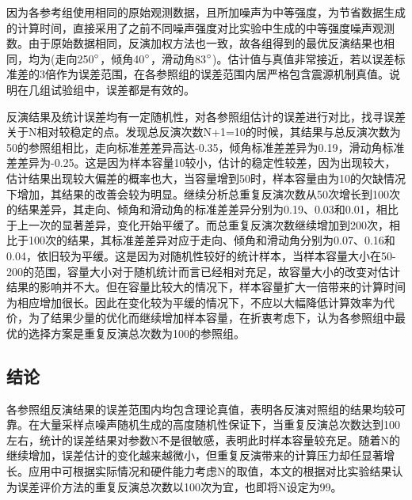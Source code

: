 因为各参考组使用相同的原始观测数据，且所加噪声为中等强度，为节省数据生成的计算时间，直接采用了之前不同噪声强度对比实验中生成的中等强度噪声观测数。由于原始数据相同，反演加权方法也一致，故各组得到的最优反演结果也相同，均为(走向250$^\circ$，倾角40$^\circ$，滑动角83$^\circ$)。估计值与真值非常接近，若以误差标准差的3倍作为误差范围，在各参照组的误差范围内居严格包含震源机制真值。说明在几组试验组中，误差都是有效的。

反演结果及统计误差均有一定随机性，对各参照组估计的误差进行对比，找寻误差关于N相对较稳定的点。发现总反演次数N+1=10的时候，其结果与总反演次数为50的参照组相比，走向标准差差异高达-0.35，倾角标准差差异为0.19，滑动角标准差差异为-0.25。这是因为样本容量10较小，估计的稳定性较差，因为出现较大，估计结果出现较大偏差的概率也大，当容量增到50时，样本容量由为10的欠缺情况下增加，其结果的改善会较为明显。继续分析总重复反演次数从50次增长到100次的结果差异，其走向、倾角和滑动角的标准差差异分别为0.19、0.03和0.01，相比于上一次的显著差异，变化开始平缓了。而总重复反演次数继续增加到200次，相比于100次的结果，其标准差差异对应于走向、倾角和滑动角分别为0.07、0.16和0.04，依旧较为平缓。这是因为对随机性较好的统计样本，当样本容量大小在50-200的范围，容量大小对于随机统计而言已经相对充足，故容量大小的改变对估计结果的影响并不大。但在容量比较大的情况下，样本容量扩大一倍带来的计算时间为相应增加很长。因此在变化较为平缓的情况下，不应以大幅降低计算效率为代价，为了结果少量的优化而继续增加样本容量，在折衷考虑下，认为各参照组中最优的选择方案是重复反演总次数为100的参照组。

\subsection{结论}
各参照组反演结果的误差范围内均包含理论真值，表明各反演对照组的结果均较可靠。在大量采样点噪声随机生成的高度随机性保证下，当重复反演总次数达到100左右，统计的误差结果对参数N不是很敏感，表明此时样本容量较充足。随着N的继续增加，误差估计的变化越来越微小，但重复反演带来的计算压力却任显著增长。应用中可根据实际情况和硬件能力考虑N的取值，本文的根据对比实验结果认为误差评价方法的重复反演总次数以100次为宜，也即将N设定为99。
